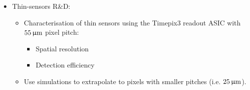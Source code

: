 \begin{frame}
\begin{columns}
\begin{adjustbox}{max totalsize={.9\textwidth}{.9\textheight},center}
    \end{adjustbox}
  \end{columns}


  \begin{itemize}
  \item Thin-sensors R\&D:
    \begin{itemize}
    \item Characterisation of thin sensors using the Timepix3 readout
      ASIC with \textcolor{Blue}{$55\,\upmu\mathrm{m}$} pixel pitch:
      \begin{itemize}
      \item Spatial resolution
      \item Detection efficiency
      \end{itemize}
    \item Use simulations to extrapolate to pixels with smaller
      pitches (i.e. $25\,\upmu\mathrm{m}$).
    \end{itemize}
  \end{itemize}



\end{frame}


